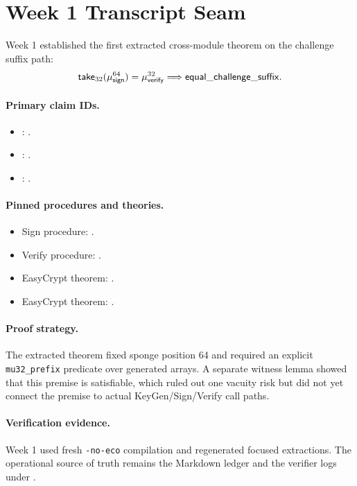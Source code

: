 \section{Week 1 Transcript Seam}
\label{sec:week1-retro}

Week 1 established the first extracted cross-module theorem on the challenge
suffix path:
\[
\mathsf{take}_{32}(\mu_{\mathsf{sign}}^{64}) = \mu_{\mathsf{verify}}^{32}
\Longrightarrow
\mathsf{equal\_challenge\_suffix}.
\]

\paragraph{Primary claim IDs.}
\begin{itemize}
  \item {}: .
  \item {}: .
  \item {}: .
\end{itemize}

\paragraph{Pinned procedures and theories.}
\begin{itemize}
  \item Sign procedure: .
  \item Verify procedure: .
  \item EasyCrypt theorem:
        .
  \item EasyCrypt theorem:
        .
\end{itemize}

\paragraph{Proof strategy.}
The extracted theorem fixed sponge position 64 and required an explicit
\texttt{mu32\_prefix} predicate over generated arrays. A separate witness lemma
showed that this premise is satisfiable, which ruled out one vacuity risk but
did not yet connect the premise to actual KeyGen/Sign/Verify call paths.

\paragraph{Verification evidence.}
Week 1 used fresh \texttt{-no-eco} compilation and regenerated focused
extractions. The operational source of truth remains the Markdown ledger and
the verifier logs under .

